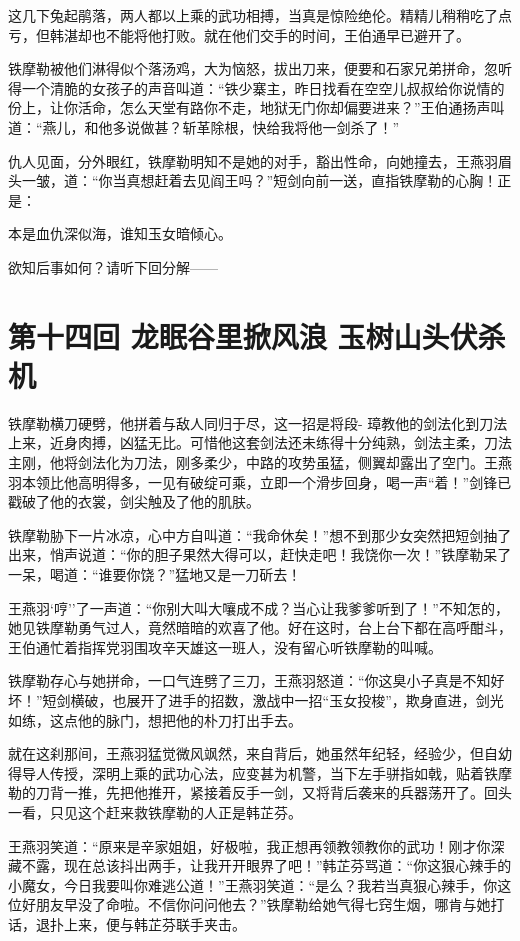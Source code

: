 \documentclass[12pt,oneside]{book}
\begin{document}
这几下兔起鹃落，两人都以上乘的武功相搏，当真是惊险绝伦。精精儿稍稍吃了点亏，但韩湛却也不能将他打败。就在他们交手的时间，王伯通早已避开了。

铁摩勒被他们淋得似个落汤鸡，大为恼怒，拔出刀来，便要和石家兄弟拼命，忽听得一个清脆的女孩子的声音叫道：``铁少寨主，昨日找看在空空儿叔叔给你说情的份上，让你活命，怎么天堂有路你不走，地狱无门你却偏要进来？''王伯通扬声叫道：``燕儿，和他多说做甚？斩革除根，快给我将他一剑杀了！''

仇人见面，分外眼红，铁摩勒明知不是她的对手，豁出性命，向她撞去，王燕羽眉头一皱，道：``你当真想赶着去见阎王吗？''短剑向前一送，直指铁摩勒的心胸！正是：

本是血仇深似海，谁知玉女暗倾心。

欲知后事如何？请听下回分解------

\chapter{第十四回 龙眠谷里掀风浪
玉树山头伏杀机}\label{ux7b2cux5341ux56dbux56de-ux9f99ux7720ux8c37ux91ccux6380ux98ceux6d6a-ux7389ux6811ux5c71ux5934ux4f0fux6740ux673a}

铁摩勒横刀硬劈，他拼着与敌人同归于尽，这一招是将段-
璋教他的剑法化到刀法上来，近身肉搏，凶猛无比。可惜他这套剑法还未练得十分纯熟，剑法主柔，刀法主刚，他将剑法化为刀法，刚多柔少，中路的攻势虽猛，侧翼却露出了空门。王燕羽本领比他高明得多，一见有破绽可乘，立即一个滑步回身，喝一声``着！''剑锋已戳破了他的衣裳，剑尖触及了他的肌肤。

铁摩勒胁下一片冰凉，心中方自叫道：``我命休矣！''想不到那少女突然把短剑抽了出来，悄声说道：``你的胆子果然大得可以，赶快走吧！我饶你一次！''铁摩勒呆了一呆，喝道：``谁要你饶？''猛地又是一刀斫去！

王燕羽`哼''了一声道：``你别大叫大嚷成不成？当心让我爹爹听到了！''不知怎的，她见铁摩勒勇气过人，竟然暗暗的欢喜了他。好在这时，台上台下都在高呼酣斗，王伯通忙着指挥党羽围攻辛天雄这一班人，没有留心听铁摩勒的叫喊。

铁摩勒存心与她拼命，一口气连劈了三刀，王燕羽怒道：``你这臭小子真是不知好坏！''短剑横破，也展开了进手的招数，激战中一招``玉女投梭''，欺身直进，剑光如练，这点他的脉门，想把他的朴刀打出手去。

就在这刹那间，王燕羽猛觉微风飒然，来自背后，她虽然年纪轻，经验少，但自幼得导人传授，深明上乘的武功心法，应变甚为机警，当下左手骈指如戟，贴着铁摩勒的刀背一推，先把他推开，紧接着反手一剑，又将背后袭来的兵器荡开了。回头一看，只见这个赶来救铁摩勒的人正是韩芷芬。

王燕羽笑道：``原来是辛家姐姐，好极啦，我正想再领教领教你的武功！刚才你深藏不露，现在总该抖出两手，让我开开眼界了吧！''韩芷芬骂道：``你这狠心辣手的小魔女，今日我要叫你难逃公道！''王燕羽笑道：``是么？我若当真狠心辣手，你这位好朋友早没了命啦。不信你问问他去？''铁摩勒给她气得七窍生烟，哪肯与她打话，退扑上来，便与韩芷芬联手夹击。
\end{document}
